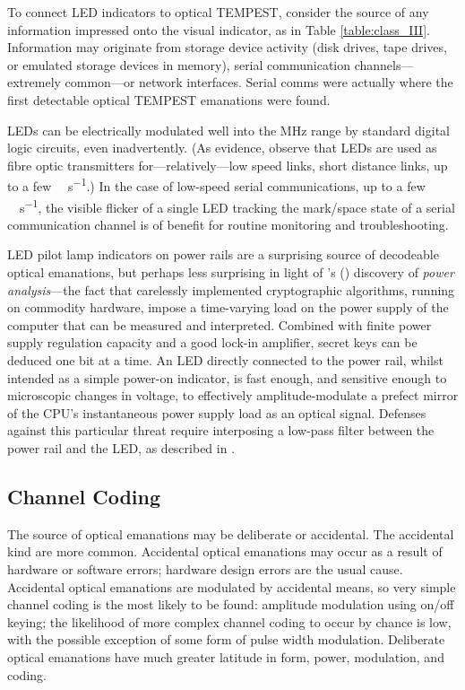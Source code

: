 \documentclass[a4paper,twoside,11pt,openany]{book}
\begin{document}
To connect LED indicators to optical TEMPEST, consider the source of any
information impressed onto the visual indicator, as in Table
\ref{table:class_III}. Information may originate from storage device activity
(disk drives, tape drives, or emulated storage devices in memory), serial
communication channels---extremely common---or network interfaces. Serial comms
were actually where the first detectable optical TEMPEST emanations were found.

LEDs can be electrically modulated well into the \si{\mega\hertz} range by
standard digital logic circuits, even inadvertently. (As evidence, observe that
LEDs are used as fibre optic transmitters for---relatively---low speed links,
short distance links, up to a few \si{\mega\bit\per\second}.) In the case of
low-speed serial communications, up to a few \si{\kilo\bit\per\second}, the
visible flicker of a single LED tracking the mark/space state of a serial
communication channel is of benefit for routine monitoring and troubleshooting.

LED pilot lamp indicators on power rails are a surprising source of decodeable
optical emanations, but perhaps less surprising in light of
\citeauthor{Kocher1999}'s (\citeyear{Kocher1999}) discovery of \emph{power
analysis}---the fact that carelessly implemented cryptographic algorithms,
running on commodity hardware, impose a time-varying load on the power supply
of the computer that can be measured and interpreted. Combined with finite
power supply regulation capacity and a good lock-in amplifier, secret keys can
be deduced one bit at a time. An LED directly connected to the power rail,
whilst intended as a simple power-on indicator, is fast enough, and sensitive
enough to microscopic changes in voltage, to effectively amplitude-modulate a
prefect mirror of the CPU's instantaneous power supply load as an optical
signal. Defenses against this particular threat require interposing a low-pass
filter between the power rail and the LED, as described in \cite{Loughry2006a}.

\subsection{Channel Coding}

The source of optical emanations may be deliberate or accidental. The
accidental kind are more common. Accidental optical emanations may occur as a
result of hardware or software errors; hardware design errors are the usual
cause. Accidental optical emanations are modulated by accidental means, so very
simple channel coding is the most likely to be found: amplitude modulation
using on/off keying; the likelihood of more complex channel coding to occur by
chance is low, with the possible exception of some form of pulse width
modulation. Deliberate optical emanations have much greater latitude in form,
power, modulation, and coding.
\end{document}
